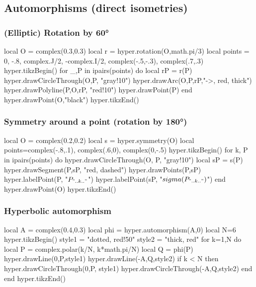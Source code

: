 \documentclass{article}
\begin{document}
\subsection{Automorphisms (direct isometries)}


\subsubsection{(Elliptic) Rotation by \ang{60}}
\begin{codeandresult}
\begin{luacode*}
local O = complex(0.3,0.3)
local r = hyper.rotation(O,math.pi/3)
local points = {0, -.8, complex.J/2, -complex.I/2, complex(-.5,-.3), complex(.7,.3)}
hyper.tikzBegin()
for _,P in ipairs(points) do
	local rP = r(P)
	hyper.drawCircleThrough(O,P, "gray!10")
	hyper.drawArc(O,P,rP,"->, red, thick")
	hyper.drawPolyline(P,O,rP, "red!10")
	hyper.drawPoint(P)
end
hyper.drawPoint(O,"black")
hyper.tikzEnd()
\end{luacode*}
\end{codeandresult}

\subsubsection{Symmetry around a point (rotation by \ang{180})}
\begin{codeandresult}
\begin{luacode*}
local O = complex(0.2,0.2)
local s = hyper.symmetry(O)
local points={complex(-.8,.1), complex(.6,0), complex(0,-.5)}
hyper.tikzBegin()
for k, P in ipairs(points) do
	hyper.drawCircleThrough(O, P, "gray!10")
	local sP = s(P)
	hyper.drawSegment(P,sP, "red, dashed")
	hyper.drawPoints(P,sP)
	hyper.labelPoint(P, "$P_{".. k .."}$")
	hyper.labelPoint(sP, "$\\sigma(P_{".. k .."})$")
end
hyper.drawPoint(O)
hyper.tikzEnd()
\end{luacode*}
\end{codeandresult}


\subsubsection{Hyperbolic automorphism}
\begin{codeandresult}
\begin{luacode*}
local A = complex(0.4,0.3)
local phi = hyper.automorphism(A,0)
local N=6
hyper.tikzBegin()
style1 = "dotted, red!50"
style2 =  "thick, red"
for k=1,N do
	local P = complex.polar(k/N, k*math.pi/N)
	local Q = phi(P)
	hyper.drawLine(0,P,style1)
	hyper.drawLine(-A,Q,style2)
	if k < N then
		hyper.drawCircleThrough(0,P, style1)
		hyper.drawCircleThrough(-A,Q,style2)
	end
end
hyper.tikzEnd()
\end{luacode*}
\end{codeandresult}
\end{document}

